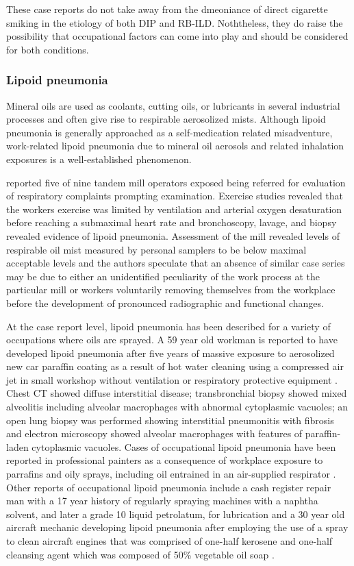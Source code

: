\documentclass[a4paper,12pt]{article}
\begin{document}
These case reports do not take away from the dmeoniance of direct cigarette smiking in the etiology of both DIP and RB-ILD. Noththeless, they do raise the possibility that occupational factors can come into play and should be considered for both conditions.

\subsubsection{Lipoid pneumonia}
Mineral oils are used as coolants, cutting oils, or lubricants in several industrial processes and often give rise to respirable aerosolized mists. Although lipoid pneumonia is generally approached as a self-medication related misadventure, work-related lipoid pneumonia due to mineral oil aerosols and related inhalation exposures is a well-established phenomenon.

\cite{Cullen1981}  reported five of nine tandem mill operators exposed being referred for evaluation of respiratory complaints prompting examination. Exercise studies revealed that the workers exercise was limited by ventilation and arterial oxygen desaturation before reaching a submaximal heart rate and bronchoscopy, lavage, and biopsy revealed evidence of lipoid pneumonia. Assessment of the mill revealed levels of respirable oil mist measured by personal samplers to be below maximal acceptable levels and the authors speculate that an absence of similar case series may be due to either an unidentified peculiarity of the work process at the particular mill or workers voluntarily removing themselves from the workplace before the development of pronounced radiographic and functional changes.

At the case report level, lipoid pneumonia has been described for a variety of occupations where oils are sprayed. A 59 year old workman is reported to have developed lipoid pneumonia after five years of massive exposure to aerosolized new car paraffin coating as a result of hot water cleaning using a compressed air jet in small workshop without ventilation or respiratory protective equipment \cite{Pujol1990}. Chest CT showed diffuse interstitial disease; transbronchial biopsy showed mixed alveolitis including alveolar macrophages with abnormal cytoplasmic vacuoles; an open lung biopsy was performed showing interstitial pneumonitis with fibrosis and electron microscopy showed alveolar macrophages with features of paraffin-laden cytoplasmic vacuoles. Cases of occupational lipoid pneumonia have been reported in professional painters as a consequence of workplace exposure to parrafins and oily sprays, including oil entrained in an air-supplied respirator  \cite{AbadFernandez2003, Carby2000}. Other reports of occupational lipoid pneumonia include a cash register repair man with a 17 year history of regularly spraying machines with a naphtha solvent, and later a grade 10 liquid petrolatum, for lubrication \cite{PROUDFIT1950} and a 30 year old aircraft mechanic developing lipoid pneumonia after employing the use of a spray to clean aircraft engines that was comprised of one-half kerosene and one-half cleansing agent which was composed of 50\% vegetable oil soap \cite{FOE1954}.
\end{document}
